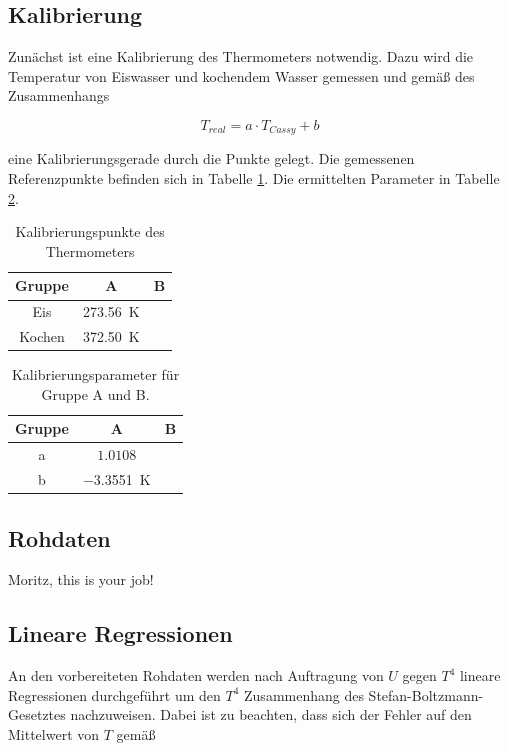 \documentclass[12pt,a4paper]{article}
\begin{document}
\subsection{Kalibrierung}
Zunächst ist eine Kalibrierung des Thermometers notwendig. Dazu wird die Temperatur von Eiswasser und kochendem Wasser gemessen und gemäß des Zusammenhangs
 
\begin{equation}
T_{real} = a \cdot T_{Cassy} + b
\end{equation}

eine Kalibrierungsgerade durch die Punkte gelegt. Die gemessenen Referenzpunkte befinden sich in Tabelle \ref{tab:Kalibrierung}. Die ermittelten Parameter in Tabelle \ref{tab:Parameter}.

\begin{table}
\centering
\begin{tabular}{|c|c|c|}
\hline
Gruppe & A & B \\
\hline
Eis & \SI{273.56}{\K} & \\
\hline
Kochen & \SI{372.50}{\K} & \\
\hline 
\end{tabular}
\caption{Kalibrierungspunkte des Thermometers}
\label{tab:Kalibrierung}
\end{table}

\begin{table}
\centering
\begin{tabular}{|c|c|c|}
\hline
Gruppe & A & B \\
\hline
a & $1.0108$ & \\
\hline
b & \SI{-3.3551}{\K} & \\
\hline
\end{tabular}
\caption{Kalibrierungsparameter für Gruppe A und B.}
\label{tab:Parameter}
\end{table}

\subsection{Rohdaten}
Moritz, this is your job!

\subsection{Lineare Regressionen}
An den vorbereiteten Rohdaten werden nach Auftragung von $U$ gegen $T^4$ lineare Regressionen durchgeführt um den $T^4$ Zusammenhang des Stefan-Boltzmann-Gesetztes nachzuweisen. Dabei ist zu beachten, dass sich der Fehler auf den Mittelwert von $T$ gemäß 
\end{document}
